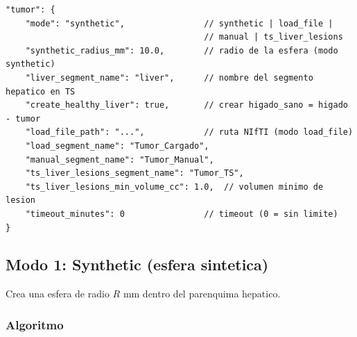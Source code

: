 \documentclass[12pt,a4paper]{article}
\begin{document}
\begin{verbatim}
"tumor": {
    "mode": "synthetic",                // synthetic | load_file |
                                        // manual | ts_liver_lesions
    "synthetic_radius_mm": 10.0,        // radio de la esfera (modo synthetic)
    "liver_segment_name": "liver",      // nombre del segmento hepatico en TS
    "create_healthy_liver": true,       // crear higado_sano = higado - tumor
    "load_file_path": "...",            // ruta NIfTI (modo load_file)
    "load_segment_name": "Tumor_Cargado",
    "manual_segment_name": "Tumor_Manual",
    "ts_liver_lesions_segment_name": "Tumor_TS",
    "ts_liver_lesions_min_volume_cc": 1.0,  // volumen minimo de lesion
    "timeout_minutes": 0                // timeout (0 = sin limite)
}
\end{verbatim}

\subsection{Modo 1: Synthetic (esfera sintetica)}

Crea una esfera de radio $R$ mm dentro del parenquima hepatico.

\subsubsection{Algoritmo}
\end{document}
